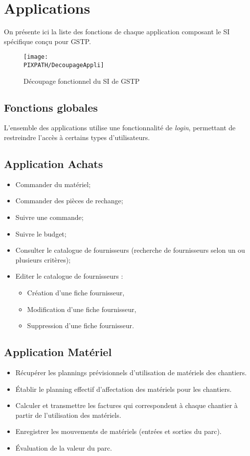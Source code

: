 \section{Applications}

On présente ici la liste des fonctions de chaque application composant le
SI spécifique conçu pour GSTP.

\begin{figure}[h]
\centering
\caption{Découpage fonctionnel du SI de GSTP}
\texttt{[image: \\PIXPATH/DecoupageAppli]}
\end{figure}


\subsection{Fonctions globales}

L'ensemble des applications utilise une fonctionnalité de {\sl login}, permettant
de restreindre l'accès à certains types d'utilisateurs.


\subsection{Application Achats}

\begin{itemize}
\item Commander du matériel;
\item Commander des pièces de rechange;
\item Suivre une commande;
\item Suivre le budget;
\item Consulter le catalogue de fournisseurs (recherche de fournisseurs selon 
un ou plusieurs critères);
\item Editer le catalogue de fournisseurs :
	\begin{itemize}
	\item Création d'une fiche fournisseur,
	\item Modification d'une fiche fournisseur,
	\item Suppression d'une fiche fournisseur.
	\end{itemize}
\end{itemize}

\subsection{Application Matériel}
\begin{itemize}
\item Récupérer les plannings prévisionnels d'utilisation de matériels
des chantiers.
\item Établir le planning effectif d'affectation des
matériels pour les chantiers.
\item Calculer et transmettre les factures qui correspondent à chaque chantier
à partir de l'utilisation des matériels.
\item Enregistrer les mouvements de matériels (entrées et sorties du parc).
\item Évaluation de la valeur du parc.
\end{itemize}


